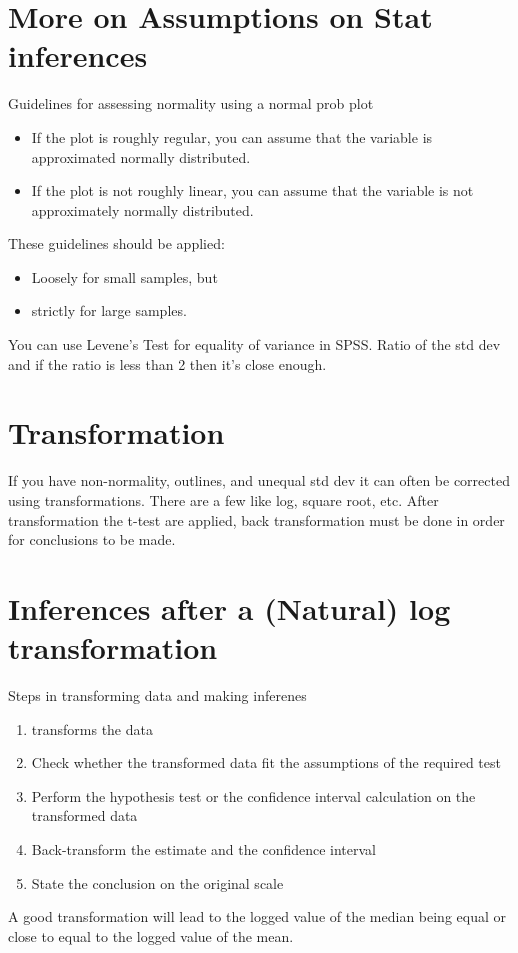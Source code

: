 \documentclass[../STAT-252-Notes.tex]{subfiles}
\begin{document}
\section{More on Assumptions on Stat inferences }

\begin{DndSidebar}[color=PhbLightGreen]{Guidelines for assessing normality using a normal prob plot}
  \begin{itemize}
    \item If the plot is roughly regular, you can assume that the variable is approximated normally distributed.
    \item If the plot is not roughly linear, you can assume that the variable is not approximately normally distributed.
  \end{itemize}

  These guidelines should be applied:
  \begin{itemize}
    \item Loosely for small samples, but
    \item strictly for large samples.
  \end{itemize}
\end{DndSidebar}
You can use Levene's Test for equality of variance in SPSS. Ratio of the std dev and if the ratio is less than 2 then it's close enough. 

\section{Transformation}
If you have non-normality, outlines, and unequal std dev it can often be corrected using transformations.
There are a few like log, square root, etc.
After transformation the t-test are applied, back transformation must be done in order for conclusions to be made.

\section{Inferences after a (Natural) log transformation}
\begin{DndSidebar}[color=PhbLightGreen]{Steps in transforming data and making inferenes}
  \begin{enumerate}
    \item transforms the data 
    \item Check whether the transformed data fit the assumptions of the required test
    \item Perform the hypothesis test or the confidence interval calculation on the transformed data
    \item Back-transform the estimate and the confidence interval
    \item State the conclusion on the original scale 
  \end{enumerate}
\end{DndSidebar}
\begin{Note}
  A good transformation will lead to the logged value of the median being equal or close to equal to the logged value of the mean.
\end{Note}
\end{document}
